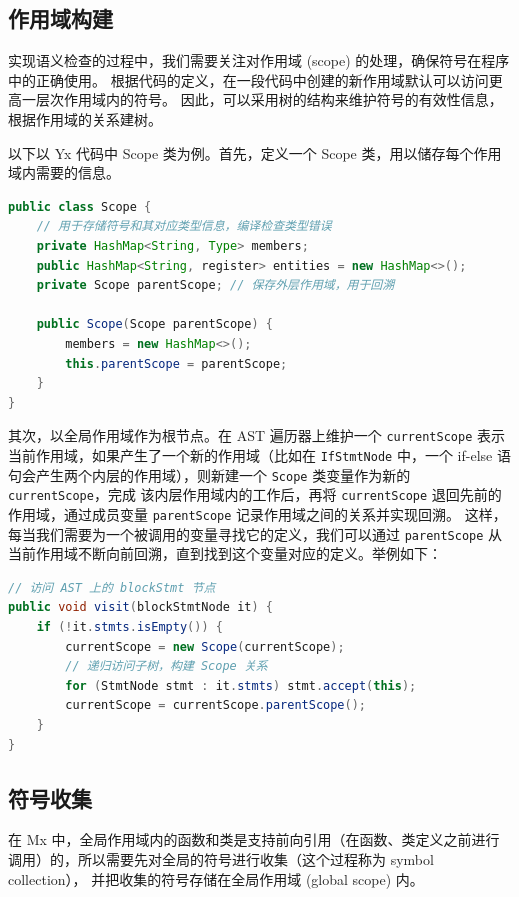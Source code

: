 
\subsection{作用域构建}
实现语义检查的过程中，我们需要关注对作用域 (scope) 的处理，确保符号在程序中的正确使用。
根据代码的定义，在一段代码中创建的新作用域默认可以访问更高一层次作用域内的符号。
因此，可以采用树的结构来维护符号的有效性信息，根据作用域的关系建树。

以下以 Yx 代码中 Scope 类为例。首先，定义一个 Scope 类，用以储存每个作用域内需要的信息。
\begin{lstlisting}[language=Java]
public class Scope {
    // 用于存储符号和其对应类型信息，编译检查类型错误
    private HashMap<String, Type> members;
    public HashMap<String, register> entities = new HashMap<>();
    private Scope parentScope; // 保存外层作用域，用于回溯

    public Scope(Scope parentScope) {
        members = new HashMap<>();
        this.parentScope = parentScope;
    }
}
\end{lstlisting}

其次，以全局作用域作为根节点。在 AST 遍历器上维护一个 \texttt{currentScope}
表示当前作用域，如果产生了一个新的作用域（比如在 \texttt{IfStmtNode} 中，一个 if-else
语句会产生两个内层的作用域），则新建一个 \texttt{Scope} 类变量作为新的 \texttt{currentScope}，完成
该内层作用域内的工作后，再将 \texttt{currentScope} 退回先前的作用域，通过成员变量
\texttt{parentScope} 记录作用域之间的关系并实现回溯。
这样，每当我们需要为一个被调用的变量寻找它的定义，我们可以通过 \texttt{parentScope}
从当前作用域不断向前回溯，直到找到这个变量对应的定义。举例如下：
\begin{lstlisting}[language=Java]
// 访问 AST 上的 blockStmt 节点
public void visit(blockStmtNode it) {
    if (!it.stmts.isEmpty()) {
        currentScope = new Scope(currentScope);
        // 递归访问子树，构建 Scope 关系
        for (StmtNode stmt : it.stmts) stmt.accept(this);
        currentScope = currentScope.parentScope();
    }
}
\end{lstlisting}

\subsection{符号收集}
在 Mx 中，全局作用域内的函数和类是支持前向引用（在函数、类定义之前进行调用）的，所以需要先对全局的符号进行收集（这个过程称为 symbol collection），
并把收集的符号存储在全局作用域 (global scope) 内。

